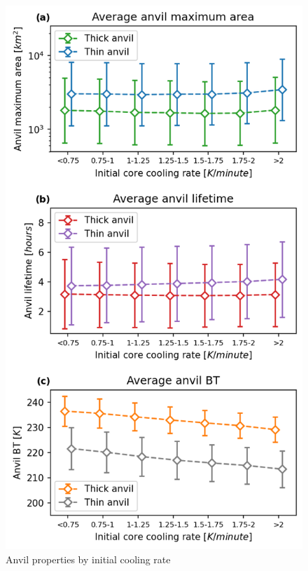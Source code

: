 \begin{figure}[tp]
    \centering
    \includegraphics[width=\textwidth]{figures/ch2_21.png}
    \caption{Anvil properties by initial cooling rate}
    \label{fig:anvil_cooling_rate_propeties}
\end{figure}

